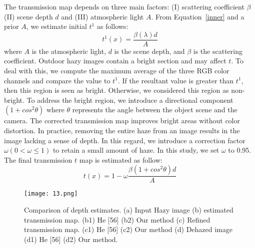 \documentclass[doctor,english,listoffigures,listoftables]{thesis-uestc}
\begin{document}
The transmission map depends on three main factors: (I) scattering coefficient $\beta$  (II) scene depth $d$ and (III) atmospheric light $A$. From Equation~\ref{inner} and a prior $A$, we estimate initial $t^1$ as follows:
\begin{equation}
	t^1(x)=\frac{\beta(\lambda)d}{A} 
\end{equation}
where $A$ is the atmospheric light, $d$ is the scene depth, and $\beta$ is the scattering coefficient. Outdoor hazy images contain a bright section and may affect $t$. To deal with this, we compute the maximum average of the three RGB color channels and compare the value to $t^1$. If the resultant value is greater than $t^1$, then this region is seen as bright. Otherwise, we considered this region as non-bright. To address the bright region, we introduce a directional component $(1+cos^2\theta)$ where $\theta$ represents the angle between the object scene and the camera. The corrected transmission map improves bright areas without color distortion. 
In practice, removing the entire haze from an image results in the image lacking a sense of depth. In this regard, we introduce a correction factor $\omega(0<\omega\leq 1)$ to retain a small amount of haze. In this study, we set $\omega$ to 0.95. The final transmission $t$ map is estimated as follow:
\begin{equation}
t(x)= 1-\omega \frac{\beta(1+cos^2\theta)d}{A} 
\end{equation}

\begin{figure}[H]
	\centering
	\texttt{[image: 13.png]}
	\caption{Comparison of depth estimates. (a) Input Hazy image (b) estimated transmission map. (b1) He [56] (b2) Our method (c) Refined transmission map. (c1) He [56] (c2) Our method (d) Dehazed image (d1) He [56] (d2) Our method.
}
	\label{fig13}
\end{figure}
\end{document}
